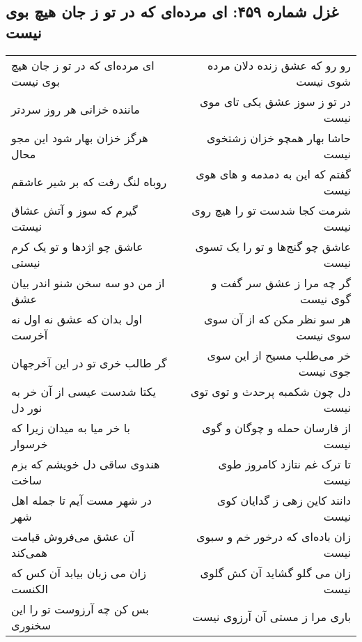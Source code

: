 \begin{center}
\section*{غزل شماره ۴۵۹: ای مرده‌ای که در تو ز جان هیچ بوی نیست}
\label{sec:0459}
\begin{longtable}{l p{0.5cm} r}
ای مرده‌ای که در تو ز جان هیچ بوی نیست
&&
رو رو که عشق زنده دلان مرده شوی نیست
\\
ماننده خزانی هر روز سردتر
&&
در تو ز سوز عشق یکی تای موی نیست
\\
هرگز خزان بهار شود این مجو محال
&&
حاشا بهار همچو خزان زشتخوی نیست
\\
روباه لنگ رفت که بر شیر عاشقم
&&
گفتم که این به دمدمه و های هوی نیست
\\
گیرم که سوز و آتش عشاق نیستت
&&
شرمت کجا شدست تو را هیچ روی نیست
\\
عاشق چو اژدها و تو یک کرم نیستی
&&
عاشق چو گنج‌ها و تو را یک تسوی نیست
\\
از من دو سه سخن شنو اندر بیان عشق
&&
گر چه مرا ز عشق سر گفت و گوی نیست
\\
اول بدان که عشق نه اول نه آخرست
&&
هر سو نظر مکن که از آن سوی سوی نیست
\\
گر طالب خری تو در این آخرجهان
&&
خر می‌طلب مسیح از این سوی جوی نیست
\\
یکتا شدست عیسی از آن خر به نور دل
&&
دل چون شکمبه پرحدث و توی توی نیست
\\
با خر میا به میدان زیرا که خرسوار
&&
از فارسان حمله و چوگان و گوی نیست
\\
هندوی ساقی دل خویشم که بزم ساخت
&&
تا ترک غم نتازد کامروز طوی نیست
\\
در شهر مست آیم تا جمله اهل شهر
&&
دانند کاین زهی ز گدایان کوی نیست
\\
آن عشق می‌فروش قیامت همی‌کند
&&
زان باده‌ای که درخور خم و سبوی نیست
\\
زان می زبان بیابد آن کس که الکنست
&&
زان می گلو گشاید آن کش گلوی نیست
\\
بس کن چه آرزوست تو را این سخنوری
&&
باری مرا ز مستی آن آرزوی نیست
\\
\end{longtable}
\end{center}
